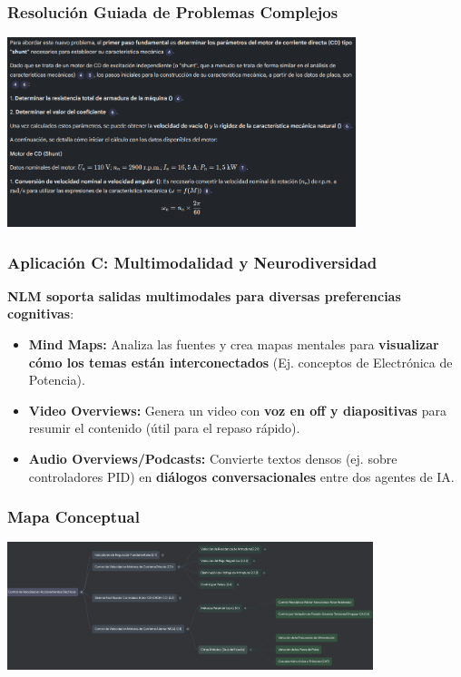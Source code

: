 \documentclass[aspectratio=43]{beamer}
\begin{document}
\begin{frame}
  \frametitle{Resolución Guiada de Problemas Complejos}
  \begin{center}
    \includegraphics[width=4in]{solucion.png}
  \end{center}
\end{frame}

\begin{frame}
\frametitle{ Aplicación C: Multimodalidad y Neurodiversidad}

\textbf{NLM soporta salidas multimodales para diversas preferencias cognitivas}:
\begin{itemize}
    \item \textbf{Mind Maps:} Analiza las fuentes y crea mapas mentales para \textbf{visualizar cómo los temas están interconectados} (Ej. conceptos de Electrónica de Potencia).
    \item \textbf{Video Overviews:} Genera un video con \textbf{voz en off y diapositivas} para resumir el contenido (útil para el repaso rápido).
    \item \textbf{Audio Overviews/Podcasts:} Convierte textos densos (ej. sobre controladores PID) en \textbf{diálogos conversacionales} entre dos agentes de IA.
\end{itemize}
\end{frame}

\begin{frame}
  \frametitle{Mapa Conceptual}
  \begin{center}
    \includegraphics[width=4.2in]{mindmap.png}
  \end{center}
\end{frame}
\end{document}
